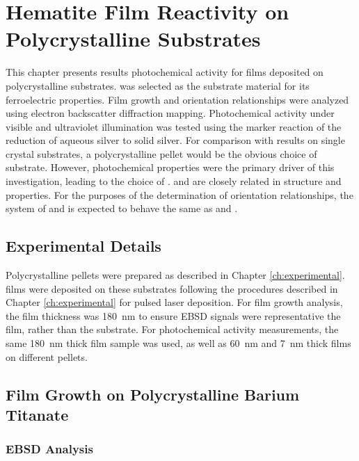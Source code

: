 
\chapter{Hematite Film Reactivity on Polycrystalline Substrates}
\label{ch:polycrystalline.reactivity.old}


This chapter presents results photochemical activity for  films deposited on polycrystalline  substrates.  was selected as the substrate material for its ferroelectric properties. Film growth and orientation relationships were analyzed using electron backscatter diffraction mapping. Photochemical activity under visible and ultraviolet illumination was tested using the marker reaction of the reduction of aqueous silver to solid silver. For comparison with results on single crystal  substrates, a polycrystalline  pellet would be the obvious choice of substrate. However, photochemical properties were the primary driver of this investigation, leading to the choice of .  and  are closely related in structure and properties. For the purposes of the determination of orientation relationships, the system of  and  is expected to behave the same as  and .


\section{Experimental Details}
\label{sec:ch6experimental}


Polycrystalline  pellets were prepared as described in Chapter \ref{ch:experimental}.  films were deposited on these substrates following the procedures described in Chapter \ref{ch:experimental} for pulsed laser deposition. For film growth analysis, the film thickness was \SI{180}{\nano\meter} to ensure EBSD signals were representative the film, rather than the substrate. For photochemical activity measurements, the same \SI{180}{\nano\meter} thick film sample was used, as well as \SI{60}{\nano\meter} and \SI{7}{\nano\meter} thick films on different  pellets.


\section{Film Growth on Polycrystalline Barium Titanate}
\label{sec:ch6filmgrowth}


\subsection{EBSD Analysis}
\label{subsec:ch6ebsd}


